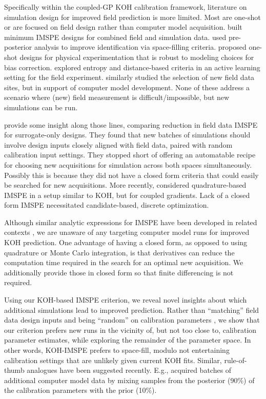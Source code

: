\documentclass[
]{article}
\begin{document}
Specifically within the coupled-GP KOH calibration framework, literature on
simulation design for improved field prediction is more limited. Most are
one-shot or are focused on field design rather than computer model
acquisition. \citet{leatherman2017designing} built minimum IMSPE designs for combined
field and simulation data.
\citet{arendt2016preposterior} used pre-posterior analysis to improve
identification via space-filling criteria. \citet{krishna2021robust} proposed
one-shot designs for physical experimentation that is robust to modeling choices
for bias correction. \citet{williams2011batch} explored entropy and
distance-based criteria in an active learning setting for the field
experiment. \citet{morris2015physical} similarly studied the selection of new
field data sites, but in support of computer model development. None of
these address a scenario where (new) field measurement is
difficult/impossible, but new simulations can be run.

\citet{ranjan2011follow} provide some insight along those lines, comparing reduction
in field data IMSPE for surrogate-only designs. They found that new batches of
simulations should involve design inputs closely aligned with field data,
paired with random calibration input settings. They stopped short of offering
an automatable recipe for choosing new acquisitions for simulation across both
spaces simultaneously. Possibly this is because they did not have a
closed form criteria that could easily be searched for new acquisitions. More
recently, \citet{chen2022apik} considered quadrature-based IMSPE in a setup similar
to KOH, but for coupled gradients. Lack of a closed form IMSPE
necessitated candidate-based, discrete optimization.

Although similar analytic expressions for IMSPE have been developed in
related contexts \citep[e.g.,][]{leatherman2017designing, binois2019replication, wycoff2021jcgs}, we are unaware of any
targeting computer model runs for improved KOH prediction. One advantage
of having a closed form, as opposed to using quadrature or Monte Carlo
integration, is that derivatives can reduce the computation time required in the search for an optimal new acquisition. We additionally provide those in closed form so that finite differencing is not required.

Using our KOH-based IMSPE criterion, we reveal novel insights about which
additional simulations lead to improved prediction. Rather than ``matching''
field data design inputs and being ``random'' on calibration parameters
\citep{ranjan2011follow}, we show that our criterion prefers new runs in the
vicinity of, but not too close to, calibration parameter estimates, while
exploring the remainder of the parameter space. In other words, KOH-IMSPE
prefers to space-fill, modulo not entertaining calibration settings that are
unlikely given current KOH fits. Similar, rule-of-thumb analogues have
been suggested recently. E.g., \citet{fer2018linking} acquired batches of additional
computer model data by mixing samples from the posterior (90\%) of the
calibration parameters with the prior (10\%).
\end{document}
